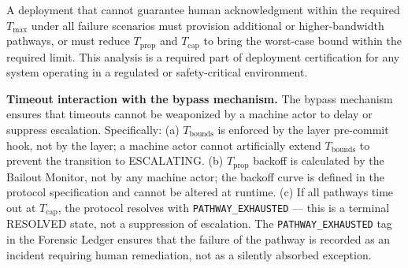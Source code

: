 A deployment that cannot guarantee human acknowledgment within the required $T_{\max}$ under all failure scenarios must provision additional or higher-bandwidth pathways, or must reduce $T_{\text{prop}}$ and $T_{\text{cap}}$ to bring the worst-case bound within the required limit. This analysis is a required part of deployment certification for any \bxthree{} system operating in a regulated or safety-critical environment.

\bigskip
\noindent\textbf{Timeout interaction with the bypass mechanism.} The bypass mechanism ensures that timeouts cannot be weaponized by a machine actor to delay or suppress escalation. Specifically: (a) $T_{\text{bounds}}$ is enforced by the \fact{} layer pre-commit hook, not by the \bounds{} layer; a machine actor cannot artificially extend $T_{\text{bounds}}$ to prevent the transition to ESCALATING. (b) $T_{\text{prop}}$ backoff is calculated by the Bailout Monitor, not by any machine actor; the backoff curve is defined in the protocol specification and cannot be altered at runtime. (c) If all pathways time out at $T_{\text{cap}}$, the protocol resolves with \texttt{PATHWAY\_EXHAUSTED} --- this is a terminal RESOLVED state, not a suppression of escalation. The \texttt{PATHWAY\_EXHAUSTED} tag in the Forensic Ledger ensures that the failure of the pathway is recorded as an incident requiring human remediation, not as a silently absorbed exception.
